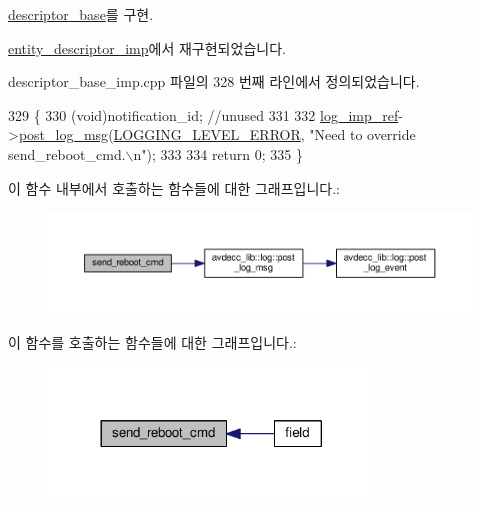 \hyperlink{classavdecc__lib_1_1descriptor__base_a1618412a9b3d57a12044030b31cfd5a3}{descriptor\+\_\+base}를 구현.



\hyperlink{classavdecc__lib_1_1entity__descriptor__imp_a7579db44e8e86da0f8f94aa4680df795}{entity\+\_\+descriptor\+\_\+imp}에서 재구현되었습니다.



descriptor\+\_\+base\+\_\+imp.\+cpp 파일의 328 번째 라인에서 정의되었습니다.


\begin{DoxyCode}
329 \{
330     (void)notification\_id; \textcolor{comment}{//unused}
331 
332     \hyperlink{namespaceavdecc__lib_acbe3e2a96ae6524943ca532c87a28529}{log\_imp\_ref}->\hyperlink{classavdecc__lib_1_1log_a68139a6297697e4ccebf36ccfd02e44a}{post\_log\_msg}(\hyperlink{namespaceavdecc__lib_a501055c431e6872ef46f252ad13f85cdaf2c4481208273451a6f5c7bb9770ec8a}{LOGGING\_LEVEL\_ERROR}, \textcolor{stringliteral}{"Need to
       override send\_reboot\_cmd.\(\backslash\)n"});
333 
334     \textcolor{keywordflow}{return} 0;
335 \}
\end{DoxyCode}


이 함수 내부에서 호출하는 함수들에 대한 그래프입니다.\+:
\nopagebreak
\begin{figure}[H]
\begin{center}
\leavevmode
\includegraphics[width=350pt]{classavdecc__lib_1_1descriptor__base__imp_a7579db44e8e86da0f8f94aa4680df795_cgraph}
\end{center}
\end{figure}




이 함수를 호출하는 함수들에 대한 그래프입니다.\+:
\nopagebreak
\begin{figure}[H]
\begin{center}
\leavevmode
\includegraphics[width=245pt]{classavdecc__lib_1_1descriptor__base__imp_a7579db44e8e86da0f8f94aa4680df795_icgraph}
\end{center}
\end{figure}


